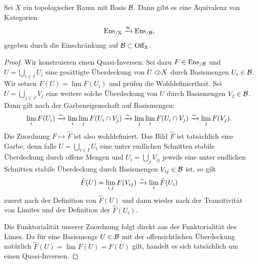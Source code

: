 \begin{satz} \label{sheaf-on-basis}
  Sei $X$ ein topologischer Raum mit Basis $\mathcal{B}$. Dann gibt es eine
  Äquivalenz von Kategorien
  \[ \operatorname{Ens_{/X}} \xrightarrow{\approx} \operatorname{Ens_{/\mathcal{B}}} , \]
  gegeben durch die Einschränkung auf $\mathcal{B} \subset \operatorname{Off_X}$.
\end{satz}
\begin{proof}
  Wir konstruieren einen Quasi-Inversen: Sei dazu $F \in \operatorname{Ens_{/\mathcal{B}}}$ und $U
  = \bigcup_{i \in I} U_i$ eine gesättigte Überdeckung von $U \subset\kern-0.58em\circ X$
  durch Basismengen $U_i \in \mathcal{B}$. Wir setzen $\hat{F}(U) = \lim
  F(U_i)$ und prüfen die Wohldefiniertheit. Sei $U = \bigcup_{j \in J}
  V_j$ eine weitere solche Überdeckung von $U$ durch Basismengen $V_j
  \in \mathcal{B}$. Dann gilt nach der Garbeneigenschaft auf Basismengen:
  \[ \lim_i F(U_i)
  \xrightarrow[]{\sim} \lim_i \lim_j F(U_i \cap V_j)
  \xrightarrow[]{\sim} \lim_j \lim_i F(U_i \cap V_j)
  \xrightarrow[]{\sim} \lim_j F(V_j) .
  \]
  Die Zuordnung $F \mapsto \hat{F}$ ist also wohldefiniert. Das Bild
  $\hat{F}$ ist tatsächlich eine Garbe, denn falls $U = \bigcup_{i \in
    I} U_i$ eine unter endlichen Schnitten stabile Überdeckung durch
  offene Mengen und $U_i = \bigcup_{j} V_{ij}$ jeweils eine unter
  endlichen Schnitten stabile Überdeckung durch Basismengen $V_{ij}
  \in \mathcal{B}$ ist, so gilt
  \[ \hat{F}(U) = \lim_{i,j} F(V_{ij}) \xrightarrow[]{\sim} \lim_i \hat{F}(U_i) \]
  zuerst nach der Definition von $\hat{F}(U)$ und dann wieder nach der
  Transitivität von Limites und der Definition der $\hat{F}(U_i)$.
  
  Die Funktorialität unserer Zuordnung folgt direkt aus der
  Funktorialität des Limes. Da für eine Basismenge $U \in \mathcal{B}$ mit der
  offensichtlichen Überdeckung natürlich $\hat{F}(U) = \lim F(U) =
  F(U) $ gilt, handelt es sich tatsächlich um einen Quasi-Inversen.
\end{proof}

